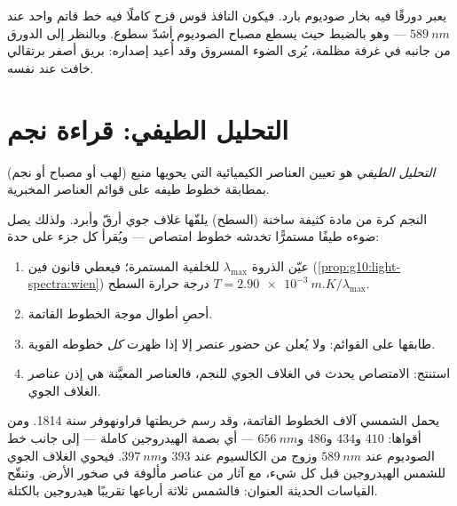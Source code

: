 \begin{example}\label{ex:g10:light-spectra:sodiumflask}
يعبر  دورقًا فيه بخار صوديوم بارد. فيكون 
النافذ قوس قزح كاملًا فيه خط قاتم واحد عند $\qty{589}{nm}$ ---
وهو بالضبط حيث يسطع مصباح الصوديوم أشدّ سطوع. وبالنظر إلى الدورق من
جانبه في غرفة مظلمة، يُرى الضوء المسروق وقد أُعيد إصداره: بريق
أصفر برتقالي خافت عند  نفسه.
\end{example}

\section{التحليل الطيفي: قراءة نجم}

\begin{definition}\label{def:g10:light-spectra:analysis}
\emph{التحليل الطيفي} هو تعيين
العناصر الكيميائية التي يحويها منبع (لهب أو مصباح أو نجم)
بمطابقة خطوط طيفه على قوائم العناصر
المخبرية.
\end{definition}

\begin{method}\label{met:g10:light-spectra:reading}
النجم كرة من مادة كثيفة ساخنة (السطح) يلفّها غلاف جوي أرقّ
وأبرد. ولذلك يصل ضوءه طيفًا مستمرًّا
تخدشه خطوط امتصاص --- ويُقرأ كل جزء على حدة:
\begin{enumerate}
  \item عيّن الذروة $\lambda_{\max}$ للخلفية المستمرة؛
        فيعطي قانون فين (\cref{prop:g10:light-spectra:wien}) درجة حرارة
        السطح $T = \qty{2.90e-3}{m.K} / \lambda_{\max}$.
  \item أحصِ أطوال موجة الخطوط القاتمة.
  \item طابقها على القوائم: ولا يُعلن عن حضور عنصر
        إلا إذا ظهرت \emph{كل} خطوطه القوية.
  \item استنتج: الامتصاص يحدث في الغلاف الجوي للنجم، فالعناصر
        المعيَّنة هي إذن عناصر الغلاف الجوي.
\end{enumerate}
\end{method}

\begin{example}\label{ex:g10:light-spectra:sunrecipe}
يحمل  الشمسي آلاف الخطوط القاتمة، وقد رسم خريطتها فراونهوفر
سنة 1814. ومن أقواها: $410$ و$434$ و$486$ و$\qty{656}{nm}$ ---
أي بصمة الهيدروجين كاملة --- إلى جانب خط الصوديوم عند
$\qty{589}{nm}$ وزوج من الكالسيوم عند $393$ و$\qty{397}{nm}$. فيحوي
الغلاف الجوي للشمس الهيدروجين قبل كل شيء، مع آثار من عناصر
مألوفة في صخور الأرض. وتنقّح القياسات الحديثة العنوان: فالشمس
ثلاثة أرباعها تقريبًا هيدروجين بالكتلة.
\end{example}

